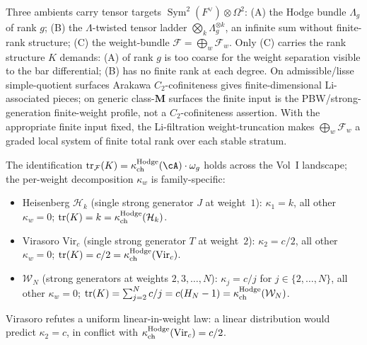 \begin{remark}
\label{rem:theoremD-ambient-identification}
Three ambients carry tensor targets
$\operatorname{Sym}^2(F^\vee) \otimes \Omega^2$:
(A) the Hodge bundle $\Lambda_g$ of rank $g$;
(B) the $\Lambda$-twisted tensor ladder
$\bigotimes_k \Lambda_g^{\otimes k}$, an infinite sum without
finite-rank structure;
(C) the weight-bundle
$\mathcal{F} = \bigoplus_w \mathcal{F}_w$. Only (C) carries the
rank structure $K$ demands: (A) of rank $g$ is too coarse for the
weight separation visible to the bar differential; (B) has no
finite rank at each degree. On admissible/lisse simple-quotient
surfaces Arakawa $C_2$-cofiniteness gives finite-dimensional
Li-associated pieces; on generic class-$\mathbf M$ surfaces the finite
input is the PBW/strong-generation finite-weight profile, not a
$C_2$-cofiniteness assertion.  With the appropriate finite input fixed,
the Li-filtration weight-truncation makes
\(\bigoplus_w \mathcal{F}_w\) a graded local system of finite total rank
over each stable stratum.
\end{remark}

\begin{proposition}
\label{prop:theoremD-weight-distribution}
\ClaimStatusProvedHere
The identification
$\operatorname{tr}_\mathcal{F}(K) = \kappaChHodge(\cA) \cdot \omega_g$
holds across the Vol~I landscape; the per-weight decomposition
$\kappa_w$ is family-specific:
\begin{itemize}
\item Heisenberg $\mathcal{H}_k$ (single strong generator $J$ at
 weight~$1$): $\kappa_1 = k$, all other $\kappa_w = 0$;
 $\operatorname{tr}(K) = k = \kappa_{\mathrm{ch}}^{\mathrm{Hodge}}(\mathcal{H}_k)$.
\item Virasoro $\mathrm{Vir}_c$ (single strong generator $T$ at
 weight~$2$): $\kappa_2 = c/2$, all other $\kappa_w = 0$;
 $\operatorname{tr}(K) = c/2 = \kappa_{\mathrm{ch}}^{\mathrm{Hodge}}(\mathrm{Vir}_c)$.
\item $\mathcal{W}_N$ (strong generators at weights
 $2, 3, \ldots, N$): $\kappa_j = c/j$ for
 $j \in \{2, \ldots, N\}$, all other $\kappa_w = 0$;
 $\operatorname{tr}(K) = \sum_{j=2}^N c/j = c(H_N - 1) =
 \kappa_{\mathrm{ch}}^{\mathrm{Hodge}}(\mathcal{W}_N)$.
\end{itemize}
Virasoro refutes a uniform linear-in-weight law: a linear
distribution would predict $\kappa_2 = c$, in conflict with
$\kappa_{\mathrm{ch}}^{\mathrm{Hodge}}(\mathrm{Vir}_c) = c/2$.
\end{proposition}

